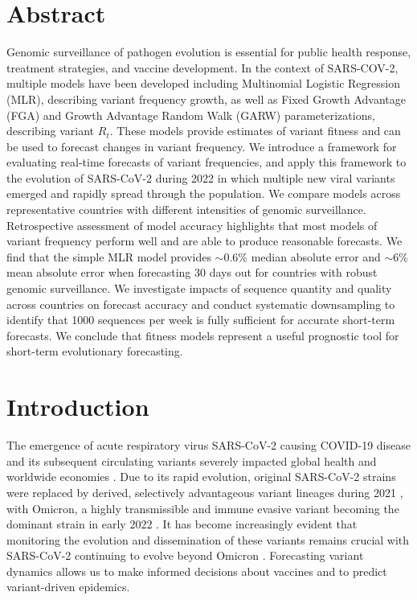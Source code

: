 \section{Abstract}
Genomic surveillance of pathogen evolution is essential for public health response, treatment strategies, and vaccine development.
In the context of SARS-COV-2, multiple models have been developed including Multinomial Logistic Regression (MLR), describing variant frequency growth, as well as Fixed Growth Advantage (FGA) and Growth Advantage Random Walk (GARW) parameterizations, describing variant $R_t$.
These models provide estimates of variant fitness and can be used to forecast changes in variant frequency.
We introduce a framework for evaluating real-time forecasts of variant frequencies, and apply this framework to the evolution of SARS-CoV-2 during 2022 in which multiple new viral variants emerged and rapidly spread through the population.
We compare models across representative countries with different intensities of genomic surveillance.
Retrospective assessment of model accuracy highlights that most models of variant frequency perform well and are able to produce reasonable forecasts.
We find that the simple MLR model provides $\sim$0.6\% median absolute error and $\sim$6\% mean absolute error when forecasting 30 days out for countries with robust genomic surveillance.
We investigate impacts of sequence quantity and quality across countries on forecast accuracy and conduct systematic downsampling to identify that 1000 sequences per week is fully sufficient for accurate short-term forecasts.
We conclude that fitness models represent a useful prognostic tool for short-term evolutionary forecasting.

\section{Introduction}
The emergence of acute respiratory virus SARS-CoV-2 causing COVID-19 disease and its subsequent circulating variants severely impacted global health and worldwide economies \cite{onyeaka2021covid19}.
Due to its rapid evolution, original SARS-CoV-2 strains were replaced by derived, selectively advantageous variant lineages during 2021 \cite{campbell2021increased}, with Omicron, a highly transmissible and immune evasive variant becoming the dominant strain in early 2022 \cite{viana2022rapid}.
It has become increasingly evident that monitoring the evolution and dissemination of these variants remains crucial with SARS-CoV-2 continuing to evolve beyond Omicron \cite{carabelli2023sarscov2}.
Forecasting variant dynamics allows us to make informed decisions about vaccines and to predict variant-driven epidemics.

